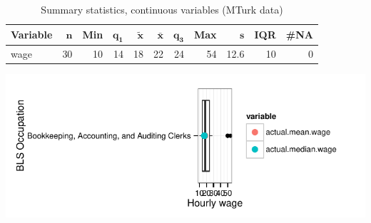 \documentclass[a4paper,10pt]{article}\usepackage[]{graphicx}\usepackage[]{color}
\makeatletter
\def\maxwidth{ %
  \ifdim\Gin@nat@width>\linewidth
    \linewidth
  \else
    \Gin@nat@width
  \fi
}
\makeatother
\begin{document}
\begin{table}[ht]
\centering
{\footnotesize
\begin{tabular}{lrrrrrrrrrr}
 \textbf{Variable} & $\mathbf{n}$ & \textbf{Min} & $\mathbf{q_1}$ & $\mathbf{\widetilde{x}}$ & $\mathbf{\bar{x}}$ & $\mathbf{q_3}$ & \textbf{Max} & $\mathbf{s}$ & \textbf{IQR} & \textbf{\#NA} \\ 
  \hline
wage & 30 & 10 & 14 & 18 & 22 & 24 & 54 & 12.6 & 10 & 0 \\ 
  \end{tabular}
}
\caption{Summary statistics, continuous variables (MTurk data)} 
\label{tab2:43-3030}
\end{table}


{\centering \includegraphics[width=\maxwidth]{figure/unnamed-chunk-218} 

}
\end{document}
